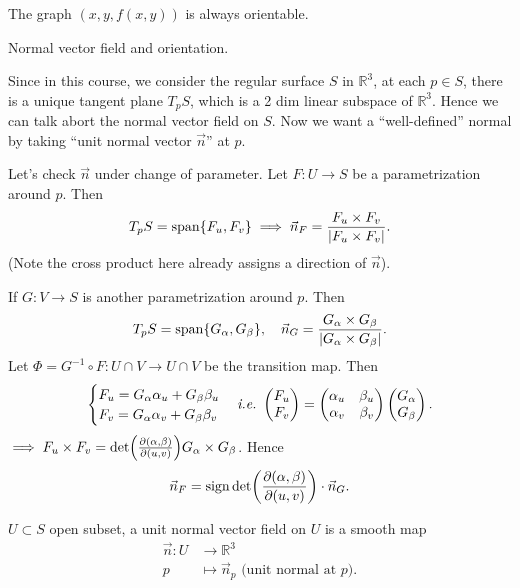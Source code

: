 \begin{example}[2]
    The graph \((x,y,f(x,y))\) is always orientable.
\end{example}

\noindent\textbullet{} Normal vector field and orientation.

Since in this course, we consider the regular surface \(S\) in \(\mathbb{R}^3\),
at each \(p\in S\), there is a unique tangent plane \(T_p S\), which is a 2 dim
linear subspace of \(\mathbb{R}^3\). Hence we can talk abort the normal vector
field on \(S\). Now we want a ``well-defined'' normal by taking ``unit normal vector
\(\vec{n}\)'' at \(p\).

Let's check \(\vec{n}\) under change of parameter. Let \(F\colon U\to S\) be
a parametrization around \(p\). Then \[
    T_p S=\operatorname{span}\{F_u,F_v\}\implies\vec{n}_F=\frac{F_u\times F_v}{|F_u\times F_v|}
.\] (Note the cross product here already assigns a direction of \(\vec{n}\)).

If \(G\colon V\to S\) is another parametrization around \(p\). Then \[
    T_p S=\operatorname{span}\{G_\alpha,G_\beta\},\quad \vec{n}_G=\frac{G_\alpha\times G_\beta}
    {|G_\alpha\times G_\beta|}
.\] Let \(\Phi=G^{-1}\circ F\colon U\cap V\to U\cap V\) be the transition map.
Then \[
    \begin{cases}
        F_u=G_\alpha\alpha_u+G_\beta\beta_u \\
        F_v=G_\alpha\alpha_v+G_\beta\beta_v
    \end{cases}
    \text{\emph{i.e.}\ }
    \begin{pmatrix}
        F_u \\ F_v
    \end{pmatrix}=\begin{pmatrix}
        \alpha_u & \beta_u \\
        \alpha_v & \beta_v
    \end{pmatrix}\begin{pmatrix}
        G_\alpha \\ G_\beta
    \end{pmatrix}
.\]
\(\implies F_u\times F_v=\det(\pdv{(\alpha,\beta)}{(u,v)})G_\alpha\times G_\beta\).
Hence \[
    \vec{n}_F=\operatorname{sign} \det(\pdv{(\alpha,\beta)}{(u,v)})\cdot \vec{n}_G
.\] 

\begin{definition}
    \(U\subset S\) open subset, a unit normal vector field on \(U\) is a smooth map
    \begin{align*}
        \vec{n}\colon U &\longrightarrow \mathbb{R}^3 \\
        p &\longmapsto \vec{n}_p\text{ (unit normal at }p\text{)}
    .\end{align*}
\end{definition}

